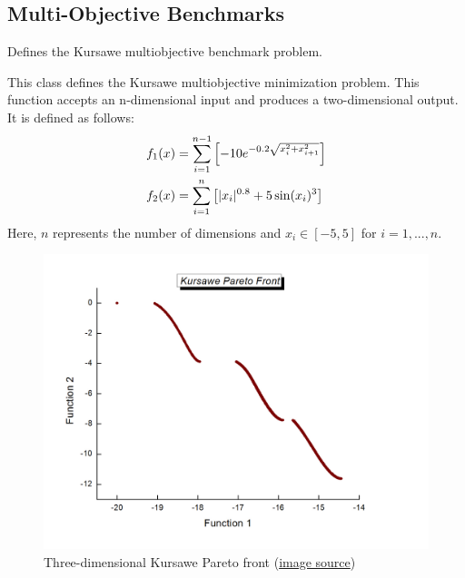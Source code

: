 \documentclass[letterpaper,10pt,english]{sphinxmanual}
\begin{document}
\subsection{Multi-Objective Benchmarks}
\label{reference:multi-objective-benchmarks}

\begin{fulllineitems}
\label{reference:inspyred.benchmarks.Kursawe}
Defines the Kursawe multiobjective benchmark problem.

This class defines the Kursawe multiobjective minimization problem. 
This function accepts an n-dimensional input and produces a 
two-dimensional output. It is defined as follows:
\begin{gather}
\begin{split}f_1(x) &= \sum_{i=1}^{n-1} \left[-10e^{-0.2\sqrt{x_i^2 + x_{i+1}^2}}\right] \\
f_2(x) &= \sum_{i=1}^n \left[|x_i|^{0.8} + 5\sin(x_i)^3\right] \\\end{split}\notag
\end{gather}
Here, $n$ represents the number of dimensions and $x_i \in [-5, 5]$ for $i=1,...,n$.
\begin{figure}[htbp]
\centering
\capstart

\includegraphics{kursawefun.jpg}
\caption{Three-dimensional Kursawe Pareto front 
(\href{http://delta.cs.cinvestav.mx/~ccoello/EMOO/testfuncs/}{image source})}\end{figure}

\end{fulllineitems}
\end{document}
